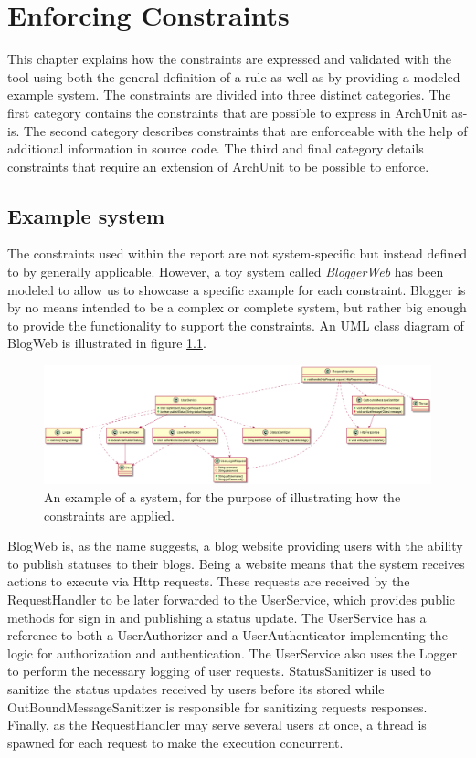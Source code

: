 \chapter{Enforcing Constraints}

This chapter explains how the constraints are expressed and validated with the tool using both the general definition of a rule as well as by providing a modeled example system. The constraints are divided into three distinct categories. The first category contains the constraints that are possible to express in ArchUnit as-is. The second category describes constraints that are enforceable with the help of additional information in source code. The third and final category details constraints that require an extension of ArchUnit to be possible to enforce.

\section{Example system}
The constraints used within the report are not system-specific but instead defined to by generally applicable. However, a toy system called \textit{BloggerWeb} has been modeled to allow us to showcase a specific example for each constraint. Blogger is by no means intended to be a complex or complete system, but rather big enough to provide the functionality to support the constraints. An UML class diagram of BlogWeb is illustrated in figure \ref{fig:toy_application}.

\begin{figure}
    \centering
    \includegraphics[width=\textwidth]{figure/ToyApp.png}
    \caption{An example of a system, for the purpose of illustrating how the constraints are applied.}
    \label{fig:toy_application}
\end{figure}

BlogWeb is, as the name suggests, a blog website providing users with the ability to publish statuses to their blogs. Being a website means that the system receives actions to execute via Http requests. These requests are received by the RequestHandler to be later forwarded to the UserService, which provides public methods for sign in and publishing a status update. The UserService has a reference to both a UserAuthorizer and a UserAuthenticator implementing the logic for authorization and authentication. The UserService also uses the Logger to perform the necessary logging of user requests. StatusSanitizer is used to sanitize the status updates received by users before its stored while OutBoundMessageSanitizer is responsible for sanitizing requests responses. Finally, as the RequestHandler may serve several users at once, a thread is spawned for each request to make the execution concurrent. 

